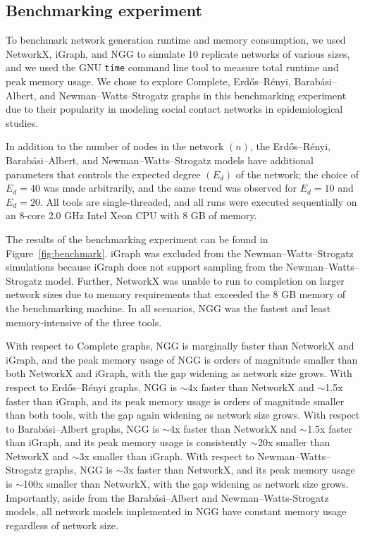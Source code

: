 \documentclass[a4paper,num-refs,gigabyte]{oup-contemporary}
\begin{document}
\subsection{Benchmarking experiment}
To benchmark network generation runtime and memory consumption, we used NetworkX, iGraph, and NGG to simulate 10 replicate networks of various sizes, and we used the GNU \texttt{time} command line tool to measure total runtime and peak memory usage. We chose to explore Complete, Erd{\H o}s--R\'enyi, Barab\'asi--Albert, and Newman--Watts--Strogatz graphs in this benchmarking experiment due to their popularity in modeling social contact networks in epidemiological studies.

In addition to the number of nodes in the network $\left(n\right)$, the Erd{\H o}s--R\'enyi, Barab\'asi--Albert, and Newman--Watts--Strogatz models have additional parameters that controls the expected degree $\left(E_d\right)$ of the network; the choice of $E_d=40$ was made arbitrarily, and the same trend was observed for $E_d=10$ and $E_d=20$. All tools are single-threaded, and all runs were executed sequentially on an 8-core 2.0 GHz Intel Xeon CPU with 8 GB of memory.

The results of the benchmarking experiment can be found in Figure~\ref{fig:benchmark}. iGraph was excluded from the Newman--Watts--Strogatz simulations because iGraph does not support sampling from the Newman--Watts--Strogatz model. Further, NetworkX was unable to run to completion on larger network sizes due to memory requirements that exceeded the 8 GB memory of the benchmarking machine. In all scenarios, NGG was the fastest and least memory-intensive of the three tools.

With respect to Complete graphs, NGG is marginally faster than NetworkX and iGraph, and the peak memory usage of NGG is orders of magnitude smaller than both NetworkX and iGraph, with the gap widening as network size grows. With respect to Erd{\H o}s--R\'enyi graphs, NGG is $\sim$4x faster than NetworkX and $\sim$1.5x faster than iGraph, and its peak memory usage is orders of magnitude smaller than both tools, with the gap again widening as network size grows. With respect to Barab\'asi--Albert graphs, NGG is $\sim$4x faster than NetworkX and $\sim$1.5x faster than iGraph, and its peak memory usage is consistently $\sim$20x smaller than NetworkX and $\sim$3x smaller than iGraph. With respect to Newman--Watts--Strogatz graphs, NGG is $\sim$3x faster than NetworkX, and its peak memory usage is $\sim$100x smaller than NetworkX, with the gap widening as network size grows. Importantly, aside from the Barab\'asi--Albert and Newman--Watts-Strogatz models, all network models implemented in NGG have constant memory usage regardless of network size.
\end{document}
